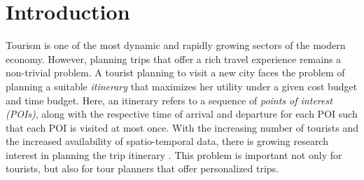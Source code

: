 \section{Introduction}

Tourism is one of the most dynamic and rapidly growing sectors of the modern
economy. However, planning trips that offer a rich travel experience remains a
non-trivial problem. A tourist planning to visit a new city faces the problem of
planning a suitable \emph{itinerary} that maximizes her utility under a given
cost budget and time budget. Here, an itinerary refers to a sequence of
\emph{points of interest (POIs)}, along with the respective time of arrival and
departure for each POI such that each POI is visited at most once. With the
increasing number of tourists and the increased availability of spatio-temporal
data, there is growing research interest in planning the trip itinerary
\cite{li2016travel, gavalas2014survey, sylejmani2011survey}. This problem is
important not only for tourists, but also for tour planners that offer
personalized trips.

